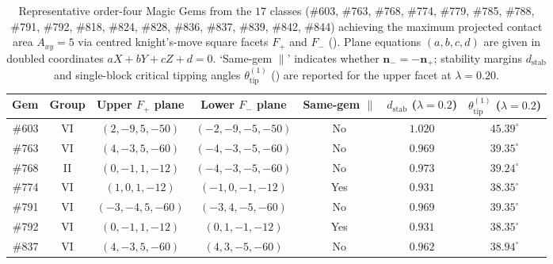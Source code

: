 \begin{table}[htbp]
\centering
\caption{Representative order-four Magic Gems from the $17$ classes (\#603, \#763, \#768, \#774, \#779, \#785, \#788, \#791, \#792, \#818, \#824, \#828, \#836, \#837, \#839, \#842, \#844) achieving the maximum projected contact area $A_{xy}=5$ via centred knight's-move square facets $F_+$ and $F_-$ (). Plane equations $(a,b,c,d)$ are given in doubled coordinates $aX+bY+cZ+d=0$. `Same-gem $\parallel$' indicates whether $\mathbf n_-=-\mathbf n_+$; stability margins $d_{\mathrm{stab}}$ and single-block critical tipping angles $\theta_{\mathrm{tip}}^{(1)}$ () are reported for the upper facet at $\lambda=0.20$.}
\label{tab:knights-move}
\small
\setlength{\tabcolsep}{5.0pt}
\begin{tabular}{r c c c c c c}
\toprule
Gem & Group & Upper $F_+$ plane & Lower $F_-$ plane & Same-gem $\parallel$ & $d_{\mathrm{stab}}$ ($\lambda=0.2$) & $\theta_{\mathrm{tip}}^{(1)}$ ($\lambda=0.2$)\\
\midrule
\#603 & VI & $(2,-9,5,-50)$ & $(-2,-9,-5,-50)$ & No  & $1.020$ & $45.39^\circ$\\
\#763 & VI & $(4,-3,5,-60)$ & $(-4,-3,-5,-60)$ & No  & $0.969$ & $39.35^\circ$\\
\#768 & II & $(0,-1,1,-12)$ & $(-4,-3,-5,-60)$ & No  & $0.973$ & $39.24^\circ$\\
\#774 & VI & $(1,0,1,-12)$  & $(-1,0,-1,-12)$  & Yes & $0.931$ & $38.35^\circ$\\
\#791 & VI & $(-3,-4,5,-60)$& $(-3,4,-5,-60)$  & No  & $0.969$ & $39.35^\circ$\\
\#792 & VI & $(0,-1,1,-12)$ & $(0,1,-1,-12)$   & Yes & $0.931$ & $38.35^\circ$\\
\#837 & VI & $(4,-3,5,-60)$ & $(4,3,-5,-60)$   & No  & $0.962$ & $38.94^\circ$\\
\bottomrule
\end{tabular}
\end{table}
